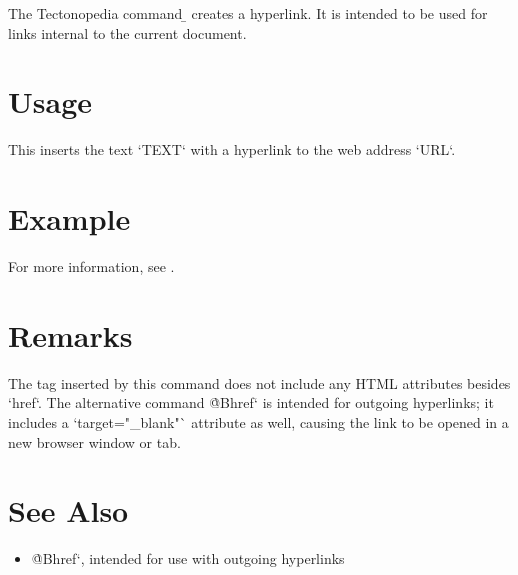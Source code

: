 The Tectonopedia command \b{\string\hrefInternal} creates a hyperlink. It is
intended to be used for links internal to the current document.

\section*{Usage}

\begin{texdisp}
\end{texdisp}

This inserts the text \tex`TEXT` with a hyperlink to the web address \tex`URL`.

\section*{Example}

\begin{texdisp}
For more information, see .
\end{texdisp}

\section*{Remarks}

The tag inserted by this command does not include any HTML attributes besides
\tex`href`. The alternative command \`@Bhref` is intended for outgoing
hyperlinks; it includes a \tex`target="_blank"` attribute as well, causing the
link to be opened in a new browser window or tab.

\section*{See Also}

\begin{itemize}
\item \`@Bhref`, intended for use with outgoing hyperlinks
\end{itemize}


